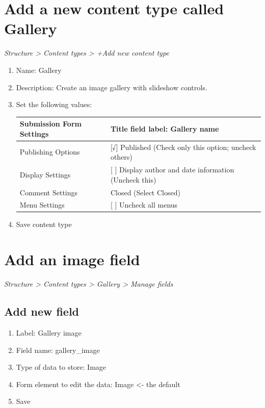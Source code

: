 \documentclass[letterpaper,10pt,english]{sphinxmanual}
\begin{document}
\section{Add a new content type called Gallery}
\label{slideshows:add-a-new-content-type-called-gallery}
\emph{Structure \textgreater{} Content types \textgreater{} +Add new content type}
\begin{enumerate}
\item {} 
Name: Gallery

\item {} 
Description: Create an image gallery with slideshow controls.

\item {} 
Set the following values:

\begin{tabulary}{\linewidth}{|L|L|}
\hline

Submission Form Settings
 & 
Title field label: Gallery name
\\\hline

Publishing Options
 & 
{[}√{]} Published (Check only this option; uncheck others)
\\\hline

Display Settings
 & 
{[} {]}  Display author and date information (Uncheck this)
\\\hline

Comment Settings
 & 
Closed (Select Closed)
\\\hline

Menu Settings
 & 
{[} {]}  Uncheck all menus
\\\hline
\end{tabulary}


\item {} 
Save content type

\end{enumerate}


\section{Add an image field}
\label{slideshows:add-an-image-field}
\emph{Structure \textgreater{} Content types \textgreater{} Gallery \textgreater{} Manage fields}


\subsection{Add new field}
\label{slideshows:add-new-field}\begin{enumerate}
\item {} 
Label: Gallery image

\item {} 
Field name: gallery\_image

\item {} 
Type of data to store: Image

\item {} 
Form element to edit the data: Image \textless{}- the default

\item {} 
Save

\end{enumerate}
\end{document}
